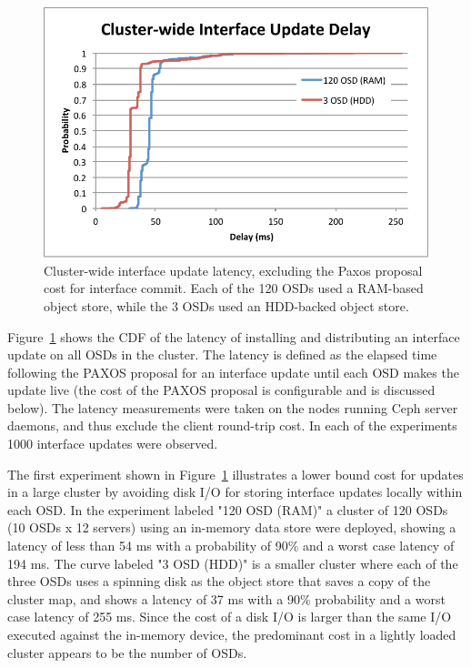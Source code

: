 \documentclass[10pt,twocolumn]{article}
\begin{document}
\begin{figure}[h]
\centering
\includegraphics[trim={1 4 4 1.3cm},clip]{figures/iface-update-delay.pdf}
\caption{Cluster-wide interface update latency, excluding the Paxos proposal cost for
interface commit. Each of the 120 OSDs used a RAM-based object store, while the
3 OSDs used an HDD-backed object store.}
\label{fig:propdelay}
\end{figure}

Figure~\ref{fig:propdelay} shows the CDF of the latency of installing and
distributing an interface update on all OSDs in the cluster. The latency is
defined as the elapsed time following the PAXOS proposal for an interface
update until each OSD makes the update live (the cost of the PAXOS proposal is
configurable and is discussed below). The latency measurements were taken on
the nodes running Ceph server daemons, and thus exclude the client round-trip
cost. In each of the experiments 1000 interface updates were observed.

The first experiment shown in Figure~\ref{fig:propdelay} illustrates a lower
bound cost for updates in a large cluster by avoiding disk I/O for storing
interface updates locally within each OSD.  In the experiment labeled "120 OSD
(RAM)" a cluster of 120 OSDs (10 OSDs x 12 servers) using an in-memory data
store were deployed, showing a latency of less than 54 ms with a probability
of 90\% and a worst case latency of 194 ms. The curve labeled "3 OSD (HDD)" is
a smaller cluster where each of the three OSDs uses a spinning disk as the
object store that saves a copy of the cluster map, and shows a latency of 37
ms with a 90\% probability and a worst case latency of 255 ms. Since the cost
of a disk I/O is larger than the same I/O executed against the in-memory
device, the predominant cost in a lightly loaded cluster appears to be the
number of OSDs.
\end{document}
